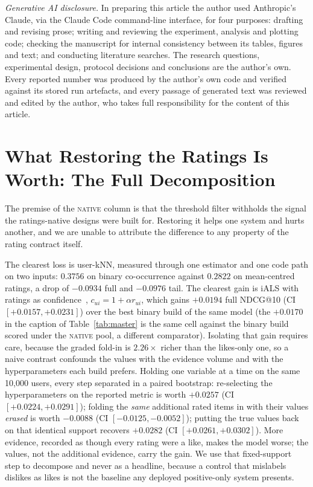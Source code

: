 \documentclass[manuscript,screen,review]{acmart}
\begin{document}
\begin{acks}

\emph{Generative AI disclosure.} In preparing this article the author used Anthropic's Claude, via
the Claude Code command-line interface, for four purposes: drafting and revising prose; writing and
reviewing the experiment, analysis and plotting code; checking the manuscript for internal
consistency between its tables, figures and text; and conducting literature searches. The research
questions, experimental design, protocol decisions and conclusions are the author's own. Every
reported number was produced by the author's own code and verified against its stored run artefacts,
and every passage of generated text was reviewed and edited by the author, who takes full
responsibility for the content of this article.
\end{acks}




\appendix
\section{What Restoring the Ratings Is Worth: The Full Decomposition}\label{app:ratings}
The premise of the \textsc{native} column is that the threshold filter withholds the signal the ratings-native designs were built for. Restoring it helps one system and hurts another, and we are unable to attribute the difference to any property of the rating contract itself.

The clearest loss is user-kNN, measured through one estimator and one code path on two inputs: $0.3756$ on binary co-occurrence against $0.2822$ on mean-centred ratings, a drop of $-0.0934$ full and $-0.0976$ tail. The clearest gain is iALS with ratings as confidence~\citep{hu2008collaborative}, $c_{ui}=1+\alpha r_{ui}$, which gains $+0.0194$ full NDCG@10 (CI $[+0.0157,+0.0231]$) over the best binary build of the same model (the $+0.0170$ in the caption of Table~\ref{tab:master} is the same cell against the binary build scored under the \textsc{native} pool, a different comparator). Isolating that gain requires care, because the graded fold-in is $2.26\times$ richer than the likes-only one, so a naive contrast confounds the values with the evidence volume and with the hyperparameters each build prefers. Holding one variable at a time on the same 10,000 users, every step separated in a paired bootstrap: re-selecting the hyperparameters on the reported metric is worth $+0.0257$ (CI $[+0.0224,+0.0291]$); folding the \emph{same} additional rated items in with their values \emph{erased} is worth $-0.0088$ (CI $[-0.0125,-0.0052]$); putting the true values back on that identical support recovers $+0.0282$ (CI $[+0.0261,+0.0302]$). More evidence, recorded as though every rating were a like, makes the model worse; the values, not the additional evidence, carry the gain. We use that fixed-support step to decompose and never as a headline, because a control that mislabels dislikes as likes is not the baseline any deployed positive-only system presents.
\end{document}
